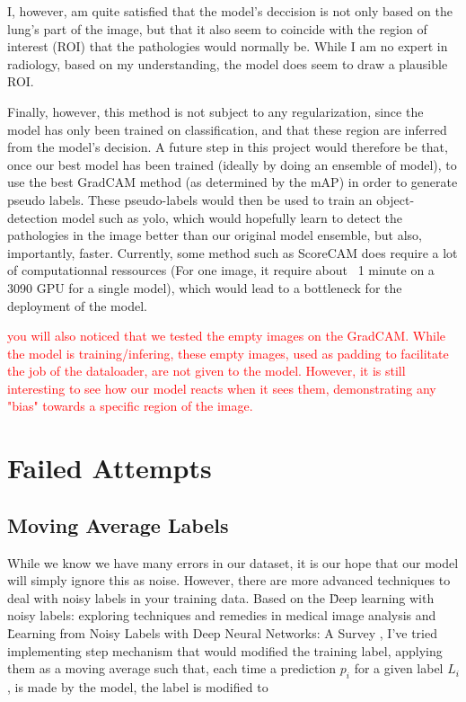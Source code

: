 \documentclass[11pt]{article}
\newcommand\myworries[1]{\textcolor{red}{#1}}
\begin{document}
    I, however, am quite satisfied that the model's deccision is not only based on the lung's part of the image, but that it also seem to coincide with the region of interest (ROI) that the pathologies would normally be. While I am
    no expert in radiology, based on my understanding, the model does seem to draw a plausible ROI.

    Finally, however, this method is not subject to any regularization, since the model has only been trained on classification, and that these region are inferred from the model's decision.
    A future step in this project would therefore be that, once our best model has been trained (ideally by doing an ensemble of model), to use the best GradCAM method (as determined by the mAP)
    in order to generate pseudo labels. These pseudo-labels would then be used to train an object-detection model such as yolo\cite{yolo}, which would hopefully learn to detect the pathologies in the image better than our original
    model ensemble, but also, importantly, faster. Currently, some method such as ScoreCAM does require a lot of computationnal ressources (For one image, it require about ~1 minute on a 3090 GPU for a single model), which would lead to a bottleneck
    for the deployment of the model.

    \myworries{you will also noticed that we tested the empty images on the GradCAM. While the model is training/infering, these empty images, used as padding to facilitate the job of the dataloader, are not given to the model.
    However, it is still interesting to see how our model reacts when it sees them, demonstrating any "bias" towards a specific region of the image.}

    \section{Failed Attempts}

    \subsection{Moving Average Labels}

        While we know we have many errors in our dataset, it is our hope that our model will simply ignore this as noise. However, there are more advanced techniques
        to deal with noisy labels in your training data.
        Based on the \" Deep learning with noisy labels: exploring techniques and remedies in medical image analysis\" \cite{noisy_label_medical} and
        \" Learning from Noisy Labels with Deep Neural Networks: A Survey \" \cite{noisy_label_review}, I've tried implementing step mechanism that would modified the training
         label, applying them as a moving average such that, each time a prediction $p_i$ for a given label $L_i$, is made by the model, the label is modified to
\end{document}
